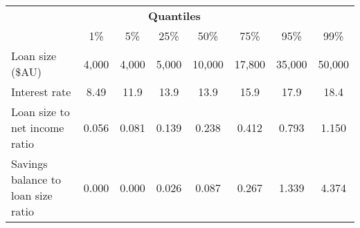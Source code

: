 \begin{tabular}{l | c c c c c c c}
    & \multicolumn{5}{c}{\textbf{Quantiles}} \\
    & 1\% & 5\% & 25\% & 50\% & 75\% & 95\% & 99\% \\
    \hline
    Loan size (\$AU) & 4,000 & 4,000 & 5,000 & 10,000 & 17,800 & 35,000 & 50,000 \\
    Interest rate & 8.49 & 11.9 & 13.9 & 13.9 & 15.9 & 17.9	& 18.4 \\
    Loan size to net income ratio & 0.056 & 0.081 & 0.139 & 0.238 & 0.412 & 0.793 & 1.150 \\
    Savings balance to loan size ratio & 0.000 & 0.000 & 0.026	& 0.087 & 0.267 & 1.339 & 4.374 
\end{tabular}